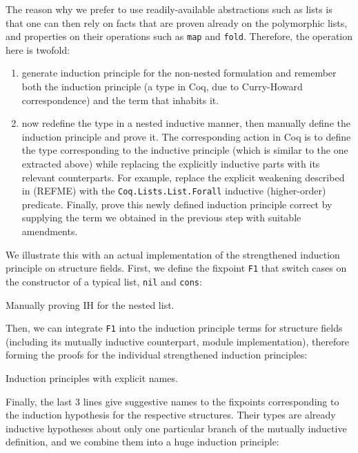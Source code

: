 The reason why we prefer to use readily-available abstractions such as lists is
that one can then rely on facts that are proven already on the polymorphic
lists, and properties on their operations such as \verb|map| and \verb|fold|.
Therefore, the operation here is twofold:

\begin{enumerate}
  \item generate induction principle for the non-nested formulation and remember
  both the induction principle (a type in Coq, due to Curry-Howard
  correspondence) and the term that inhabits it.
  \item now redefine the type in a nested inductive manner, then manually define
  the induction principle and prove it. The corresponding action in Coq is to
  define the type corresponding to the inductive principle (which is similar to
  the one extracted above) while replacing the explicitly inductive parts with
  its relevant counterparts. For example, replace the explicit weakening
  described in (REFME) with the \verb|Coq.Lists.List.Forall| inductive
  (higher-order) predicate. Finally, prove this newly defined induction
  principle correct by supplying the term we obtained in the previous step with
  suitable amendments.
\end{enumerate}

We illustrate this with an actual implementation of the strengthened induction
principle on structure fields. First, we define the fixpoint \verb|F1| that
switch cases on the constructor of a typical list, \verb|nil| and \verb|cons|:

\begin{listing}[H]
  \caption{Manually proving IH for the nested list.}
  \label{lst:def-nn-ih}
\end{listing}

Then, we can integrate \verb|F1| into the induction principle terms for
structure fields (including its mutually inductive counterpart, module
implementation), therefore forming the proofs for the individual strengthened
induction principles:

\begin{listing}[H]
  \caption{Induction principles with explicit names.}
  \label{lst:def-nn-ih-plus}
\end{listing}

Finally, the last 3 lines give suggestive names to the fixpoints corresponding
to the induction hypothesis for the respective structures. Their types are
already inductive hypotheses about only one particular branch of the mutually
inductive definition, and we combine them into a huge induction principle:

